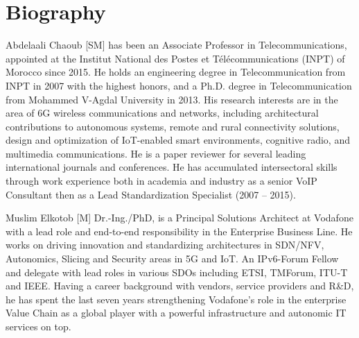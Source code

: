 \section*{Biography}
\label{sec:bio}
\small
\begin{IEEEbiographynophoto}{Abdelaali Chaoub} [SM] has been an Associate Professor in Telecommunications, appointed at the Institut National des Postes et Télécommunications (INPT) of Morocco since 2015. He holds an engineering degree in Telecommunication from INPT in 2007 with the highest honors, and a Ph.D. degree in Telecommunication from Mohammed V-Agdal University in 2013. His research interests are in the area of 6G wireless communications and networks, including architectural contributions to autonomous systems, remote and rural connectivity solutions, design and optimization of IoT-enabled smart environments, cognitive radio, and multimedia communications. He is a paper reviewer for several leading international journals and conferences. He has accumulated intersectoral skills through work experience both in academia and industry as a senior VoIP Consultant then as a Lead Standardization Specialist (2007 – 2015).
\end{IEEEbiographynophoto}

\begin{IEEEbiographynophoto}{Muslim Elkotob} [M] Dr.-Ing./PhD, is a Principal Solutions Architect at Vodafone with a lead role and end-to-end responsibility in the Enterprise Business Line. He works on driving innovation and standardizing architectures in SDN/NFV, Autonomics, Slicing and Security areas in 5G and IoT. An IPv6-Forum Fellow and delegate with lead roles in various SDOs including ETSI, TMForum, ITU-T and IEEE. Having a career background with vendors, service providers and R\&D, he has spent the last seven years strengthening Vodafone's role in the enterprise Value Chain as a global player with a powerful infrastructure and autonomic IT services on top.
\end{IEEEbiographynophoto}%
